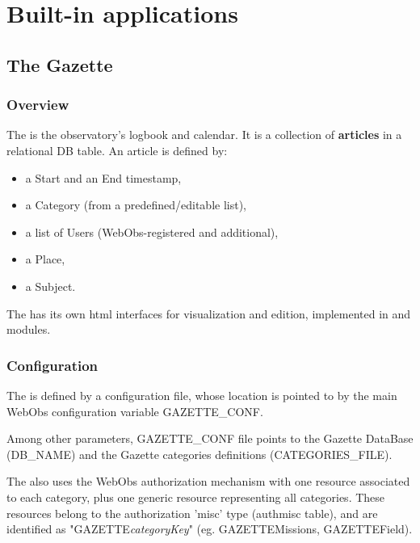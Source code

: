 

\chapter{Built-in applications}
\label{builtin}

\section{The Gazette}

\subsection{Overview}

The  is the observatory's logbook and calendar. It is a collection 
of \textbf{articles} in a relational DB table. An article is defined by: 
\begin{itemize}
\item a Start and an End timestamp,
\item a Category (from a predefined/editable list),
\item a list of Users (WebObs-registered and additional),
\item a Place,
\item a Subject.
\end{itemize}

The  has its own html interfaces for visualization and edition, implemented
in  and  modules.

\subsection{Configuration}

The  is defined by a configuration file,
whose location is pointed to by the main WebObs configuration variable
GAZETTE\_CONF.

Among other parameters, GAZETTE\_CONF file points to the Gazette DataBase (DB\_NAME)
and the Gazette categories definitions (CATEGORIES\_FILE).

The  also uses the WebObs authorization mechanism with one resource associated to each 
category, plus one generic resource representing all categories. These resources
belong to the authorization 'misc' type (authmisc table), and are identified as  
"GAZETTE\textit{categoryKey}"  (eg. GAZETTEMissions, GAZETTEField). 

